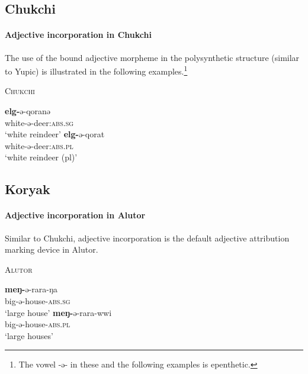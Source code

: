\subsection{Chukchi}
\paragraph{Adjective incorporation in Chukchi}
The use of the bound adjective morpheme in the polysynthetic structure (similar to Yupic) is illustrated in the following examples.\footnote{The vowel -ə- in these and the following examples is epenthetic.}

\begin{exe}
\ex \textsc{Chukchi} \citep{skorik1960}
\begin{xlist}
\ex	
\gll	\textbf{elg-}ə-qoranə\\
	white-ə-deer:\textsc{abs.sg}\\
\glt	‘white reindeer’
\ex
\gll	\textbf{elg-}ə-qorat\\
	white-ə-deer:\textsc{abs.pl}\\
\glt	‘white reindeer (pl)’
\end{xlist}
\end{exe}

\subsection{Koryak}
\paragraph{Adjective incorporation in Alutor}
Similar to Chukchi, adjective incorporation is the default adjective attribution marking device in Alutor.
\begin{exe}
\ex \textsc{Alutor} \citep{nagayama2003}
\begin{xlist}
\ex
\gll	\textbf{meŋ-}ə-rara-ŋa\\
	big-ə-house-\textsc{abs.sg}\\
\glt	‘large house’
\ex
\gll	\textbf{meŋ-}ə-rara-wwi\\
	big-ə-house-\textsc{abs.pl}\\
\glt	‘large houses’
\end{xlist}
\end{exe}

